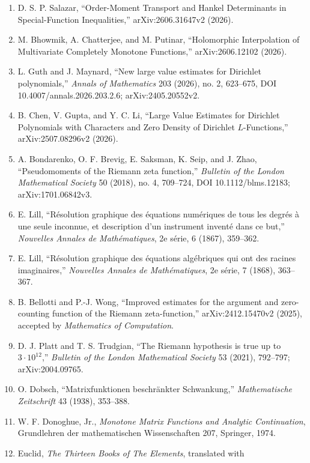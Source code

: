 \documentclass[
  11pt,
]{book}
\begin{document}
\begin{enumerate}
  Through Time,'' arXiv:2602.04022v1 (2026).
\item
  D. S. P. Salazar, ``Order-Moment Transport and Hankel Determinants in
  Special-Function Inequalities,'' arXiv:2606.31647v2 (2026).
\item
  M. Bhowmik, A. Chatterjee, and M. Putinar, ``Holomorphic Interpolation
  of Multivariate Completely Monotone Functions,'' arXiv:2606.12102
  (2026).
\item
  L. Guth and J. Maynard, ``New large value estimates for Dirichlet
  polynomials,'' \emph{Annals of Mathematics} 203 (2026), no. 2,
  623--675, DOI 10.4007/annals.2026.203.2.6; arXiv:2405.20552v2.
\item
  B. Chen, V. Gupta, and Y. C. Li, ``Large Value Estimates for Dirichlet
  Polynomials with Characters and Zero Density of Dirichlet
  \(L\)-Functions,'' arXiv:2507.08296v2 (2026).
\item
  A. Bondarenko, O. F. Brevig, E. Saksman, K. Seip, and J. Zhao,
  ``Pseudomoments of the Riemann zeta function,'' \emph{Bulletin of the
  London Mathematical Society} 50 (2018), no. 4, 709--724, DOI
  10.1112/blms.12183; arXiv:1701.06842v3.
\item
  E. Lill, ``Résolution graphique des équations numériques de tous les
  degrés à une seule inconnue, et description d'un instrument inventé
  dans ce but,'' \emph{Nouvelles Annales de Mathématiques}, 2e série, 6
  (1867), 359--362.
\item
  E. Lill, ``Résolution graphique des équations algébriques qui ont des
  racines imaginaires,'' \emph{Nouvelles Annales de Mathématiques}, 2e
  série, 7 (1868), 363--367.
\item
  B. Bellotti and P.-J. Wong, ``Improved estimates for the argument and
  zero-counting function of the Riemann zeta-function,''
  arXiv:2412.15470v2 (2025), accepted by \emph{Mathematics of
  Computation}.
\item
  D. J. Platt and T. S. Trudgian, ``The Riemann hypothesis is true up to
  \(3\cdot10^{12}\),'' \emph{Bulletin of the London Mathematical
  Society} 53 (2021), 792--797; arXiv:2004.09765.
\item
  O. Dobsch, ``Matrixfunktionen beschränkter Schwankung,''
  \emph{Mathematische Zeitschrift} 43 (1938), 353--388.
\item
  W. F. Donoghue, Jr., \emph{Monotone Matrix Functions and Analytic
  Continuation}, Grundlehren der mathematischen Wissenschaften 207,
  Springer, 1974.
\item
  Euclid, \emph{The Thirteen Books of The Elements}, translated with

\end{enumerate}
\end{document}
